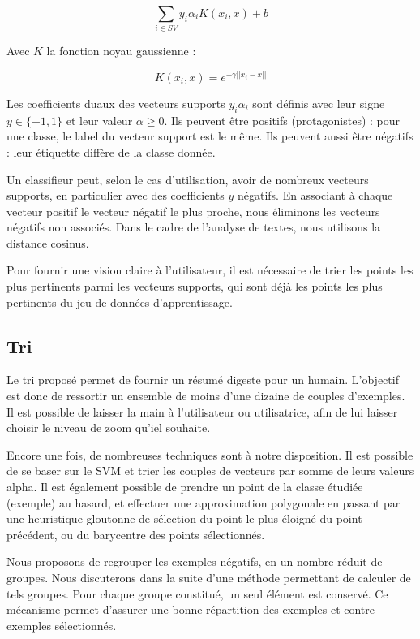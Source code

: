 \begin{equation}
\sum_{i \in SV}y_i\alpha_i K(x_i,x)+b
\end{equation}

Avec $K$ la fonction noyau gaussienne :

\begin{equation}
   K(x_i, x) = e^{-\gamma||x_i-x||}
\end{equation}

Les coefficients duaux des vecteurs supports $y_i\alpha_i $ sont définis avec leur signe $y \in \{-1,1\}$ et leur valeur $\alpha \geq 0$. Ils peuvent être positifs (protagonistes) : pour une classe, le label du vecteur support est le même. Ils peuvent aussi être négatifs : leur étiquette diffère de la classe donnée.

Un classifieur peut, selon le cas d'utilisation, avoir de nombreux vecteurs supports, en particulier avec des coefficients $y$ négatifs. En associant à chaque vecteur positif le vecteur négatif le plus proche, nous éliminons les vecteurs négatifs non associés. Dans le cadre de l'analyse de textes, nous utilisons la distance cosinus.

Pour fournir une vision claire à l'utilisateur, il est nécessaire de trier les points les plus pertinents parmi les vecteurs supports, qui sont déjà les points les plus pertinents du jeu de données d'apprentissage.

\subsection{Tri} \label{C4:tri}

Le tri proposé permet de fournir un résumé digeste pour un humain. L'objectif est donc de ressortir un ensemble de moins d'une dizaine de couples d'exemples. Il est possible de laisser la main à l'utilisateur ou utilisatrice, afin de lui laisser choisir le niveau de zoom qu'iel souhaite.

Encore une fois, de nombreuses techniques sont à notre disposition. Il est possible de se baser sur le SVM et trier les couples de vecteurs par somme de leurs valeurs alpha. Il est également possible de prendre un point de la classe étudiée (exemple) au hasard, et effectuer une approximation polygonale en passant par une heuristique gloutonne de sélection du point le plus éloigné du point précédent, ou du barycentre des points sélectionnés.

Nous proposons de regrouper les exemples négatifs, en un nombre réduit de groupes. Nous discuterons dans la suite d’une méthode permettant de calculer de tels groupes. Pour chaque groupe constitué, un seul élément est conservé. Ce mécanisme permet d'assurer une bonne répartition des exemples et contre-exemples sélectionnés.

